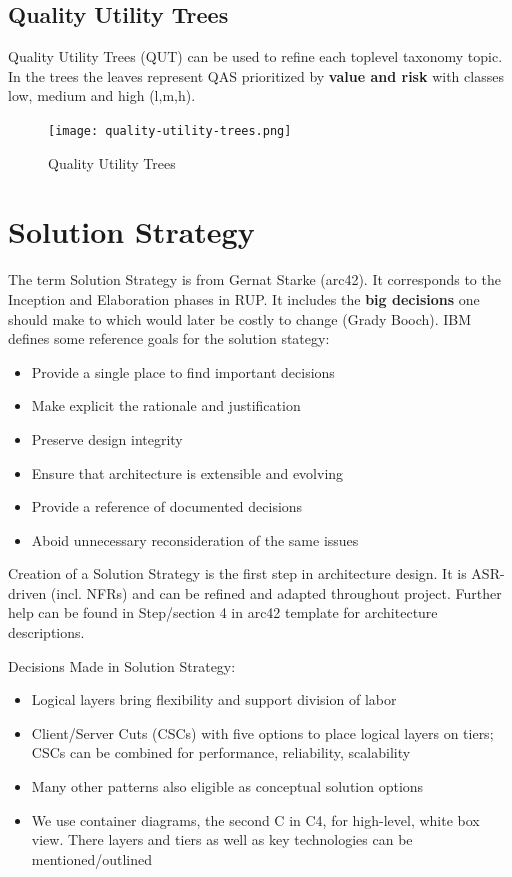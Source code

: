 \documentclass[../Main.tex]{subfiles}
\begin{document}
\newpage

\subsection{Quality Utility Trees}
Quality Utility Trees (QUT) can be used to refine
each toplevel taxonomy topic. In the trees the leaves
represent QAS prioritized by \textbf{value and risk} with classes low, medium and high (l,m,h).

\begin{figure}[H]
    \centering
    \texttt{[image: quality-utility-trees.png]}
    \caption{Quality Utility Trees}
\end{figure}
\newpage

\section{Solution Strategy}
The term Solution Strategy is from Gernat Starke (arc42).
It corresponds to the Inception and Elaboration phases in
RUP. It includes the \textbf{big decisions}
one should make to which would later be costly to change (Grady Booch).
IBM defines some reference goals for the solution stategy:
\begin{itemize}
    \item Provide a single place to find important decisions
    \item Make explicit the rationale and justification
    \item Preserve design integrity
    \item Ensure that architecture is extensible and evolving
    \item Provide a reference of documented decisions
    \item Aboid unnecessary reconsideration of the same issues
\end{itemize}

Creation of a Solution Strategy is the first step in architecture design.
It is ASR-driven (incl. NFRs) and can be refined and adapted throughout project.
Further help can be found in Step/section 4 in arc42 template for architecture descriptions.

Decisions Made in Solution Strategy:
\begin{itemize}
    \item Logical layers bring flexibility and support division of labor
    \item Client/Server Cuts (CSCs) with five options to place logical layers on tiers;  CSCs can be combined for 
    performance, reliability, scalability 
    \item Many other patterns also eligible as conceptual solution options
    \item We use container diagrams, the second C in C4, for high-level, white box view.
    There layers and tiers as well as key technologies can be mentioned/outlined
\end{itemize}
\end{document}
